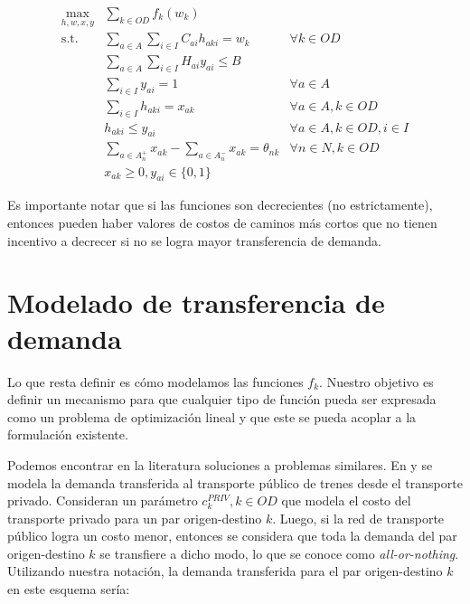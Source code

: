 \begin{align}
  \max_{h,w,x,y}          & \sum_{k \in OD} f_k(w_k)                                    & \label{eq:objectivealt} \\
  \text{s.t.}\; & \sum_{a \in A} \sum_{i \in I} C_{ai}h_{aki} = w_k           & \forall k \in OD \label{eq:shortestpathalt} \\
                & \sum_{a \in A} \sum_{i \in I} H_{ai}y_{ai} \leq B           & \label{eq:respectbudgetalt} \\
                & \sum_{i \in I} y_{ai} = 1                                   & \forall a \in A \label{eq:alwaysoneyalt} \\
                & \sum_{i \in I} h_{aki} = x_{ak}                             & \forall a \in A, k \in OD \\
                & h_{aki} \leq y_{ai}                                         & \forall a \in A, k \in OD, i \in I \\
                & \sum_{a \in A_n^+} x_{ak} - \sum_{a \in A_n^-} x_{ak} = \theta_{nk}   & \forall n \in N, k \in OD \label{eq:flowbalancealt} \\
                & x_{ak} \geq 0, y_{ai} \in \{0,1\}                           & \nonumber
\end{align}

Es importante notar que si las funciones son decrecientes (no estrictamente), entonces pueden haber valores de costos de caminos más cortos que no tienen incentivo a decrecer si no se logra mayor transferencia de demanda.

\section{Modelado de transferencia de demanda}
\label{sect:transferfunctiondefs}

Lo que resta definir es cómo modelamos las funciones $f_k$. Nuestro objetivo es definir un mecanismo para que cualquier tipo de función pueda ser expresada como un problema de optimización lineal y que este se pueda acoplar a la formulación existente.

Podemos encontrar en la literatura soluciones a problemas similares. En \textcite{laporte2007} y \textcite{marin2007} se modela la demanda transferida al transporte público de trenes desde el transporte privado. Consideran un parámetro $c^{PRIV}_k, k \in OD$ que modela el costo del transporte privado para un par origen-destino $k$. Luego, si la red de transporte público logra un costo menor, entonces se considera que toda la demanda del par origen-destino $k$ se transfiere a dicho modo, lo que se conoce como {\it all-or-nothing}. Utilizando nuestra notación, la demanda transferida para el par origen-destino $k$ en este esquema sería:


